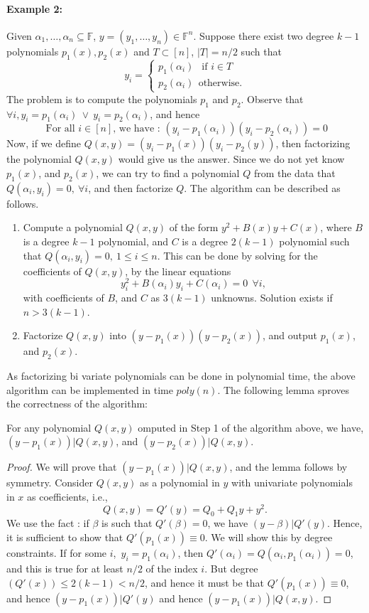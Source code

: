 \paragraph{Example 2:} Given ${\alpha_1,\ldots, \alpha_n}\subseteq {\mathbb F}$, $y=(y_1,\ldots, y_n)\in {\mathbb F}^n$. Suppose there exist two degree $k-1$ polynomials $p_1(x), p_2(x)$ and $T\subset [n]$, $|T|=n/2$ such that
\[ y_i=\begin{cases} p_1(\alpha_i)~~\mbox{ if } i \in T\\ p_2(\alpha_i)~~\mbox{otherwise}. \end{cases}\]
The problem is to compute the polynomials  $p_1$ and $p_2$. 
Observe that $\forall i, y_i= p_1(\alpha_i)~\vee~y_i=p_2(\alpha_i)$, and hence
\[ \textrm{ For all $i \in [n]$, we have : } (y_i- p_1(\alpha_i))(y_i-p_2(\alpha_i)) = 0 \]
Now, if we define $Q(x,y)=(y_i- p_1(x))(y_i-p_2(y))$, then factorizing the polynomial $Q(x,y)$ would give us the answer. Since we do not yet know $p_1(x)$, and $p_2(x)$, we can try to find a polynomial
$Q$ from the data that $Q(\alpha_i,y_i)=0,~\forall i$, and then factorize $Q$. The algorithm can be described as follows.
\begin{enumerate}
\item Compute a polynomial $Q(x,y)$ of the form $y^2+ B(x)y+ C(x)$, where $B$ is a degree $k-1$ polynomial, and $C$ is a degree $2(k-1)$ polynomial such that  $Q(\alpha_i, y_i)=0,~1\le i\le n$. This can be done by solving for the coefficients of $Q(x,y)$, by the linear equations
\[ y_{i}^2+ B(\alpha_i) y_i+ C(\alpha_i)=0~~\forall i, \]
with coefficients of $B$, and $C$ as $3(k-1)$ unknowns. Solution exists if $n>3(k-1)$.
\item Factorize $Q(x,y)$ into $(y-p_1(x))(y-p_2(x))$, and output $p_1(x)$, and $p_2(x)$.
\end{enumerate}
As factorizing bi variate polynomials can be done in polynomial time, the above algorithm can be implemented in time $poly(n)$.  The following lemma sproves the correctness of the algorithm:
\begin{lemma}
For any polynomial $Q(x,y)$ omputed in Step 1 of the algorithm above, we have, $(y-p_1(x))|Q(x,y)$, and $(y-p_2(x))|Q(x,y)$.
\end{lemma}
\begin{proof}
We will prove that $(y-p_1(x))|Q(x,y)$, and the lemma follows by symmetry.
Consider $Q(x,y)$ as a polynomial in $y$ with  univariate polynomials in $x$ as coefficients, i.e.,
\[Q(x,y)=Q'(y)= Q_0+ Q_1y+ y^2.\]
We use the fact : if  $\beta$ is such that $Q'(\beta)=0$, we have $(y-\beta)|Q'(y)$. Hence, it is sufficient to show that $Q'(p_1(x))\equiv 0.$
We will show this by degree constraints. If for some $i$,~$y_i=p_1(\alpha_i)$, then $Q'(\alpha_i)=Q(\alpha_i, p_1(\alpha_i))=0$, and this is true for
at least $n/2$ of the index  $i$. But degree$(Q'(x)) \le 2(k-1)< n/2$, and hence it must be that $Q'(p_1(x)) \equiv 0$, and hence $(y-p_1(x))|Q'(y)$ and hence $(y-p_1(x))|Q(x,y)$.
\end{proof}

